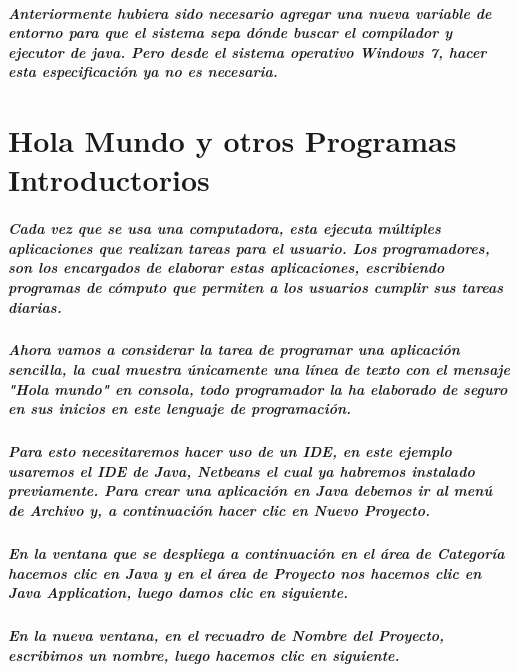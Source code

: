 \documentclass[12pt]{book} %
\begin{document}
\paragraph{Anteriormente hubiera sido necesario agregar una nueva variable de entorno para que el sistema sepa dónde buscar el compilador y ejecutor de java. Pero desde el sistema operativo Windows 7, hacer esta especificación ya no es necesaria.}


\chapter{Hola Mundo y otros Programas Introductorios}

\paragraph{Cada vez que se usa una computadora, esta ejecuta múltiples aplicaciones que realizan tareas para el usuario. Los programadores, son los encargados de elaborar estas aplicaciones, escribiendo programas de cómputo que permiten a los usuarios cumplir sus tareas diarias.}
\paragraph{Ahora vamos a considerar la tarea de programar una aplicación sencilla, la cual muestra únicamente una línea de texto con el mensaje "Hola mundo" en consola, todo programador la ha elaborado de seguro en sus inicios en este lenguaje de programación.}
\paragraph{Para esto necesitaremos hacer uso de un IDE, en este ejemplo usaremos el IDE de Java, Netbeans el cual ya habremos instalado previamente.
Para crear una aplicación en Java debemos ir al menú de Archivo y, a continuación hacer clic en Nuevo Proyecto.}
\paragraph{En la ventana que se despliega a continuación en el área de Categoría hacemos clic en Java y en el área de Proyecto nos hacemos clic en Java Application, luego damos clic en siguiente.}
\paragraph{En la nueva ventana, en el recuadro de Nombre del Proyecto, escribimos un nombre, luego hacemos clic en siguiente.}
\end{document}
